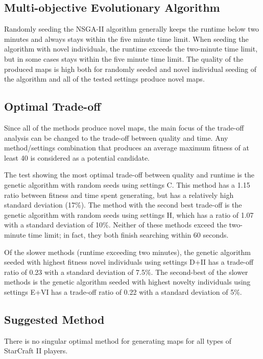 \subsection{Multi-objective Evolutionary Algorithm}
\label{discussion_comparison_moea}
Randomly seeding the NSGA-II algorithm generally keeps the runtime below two minutes and always stays within the five minute time limit. When seeding the algorithm with novel individuals, the runtime exceeds the two-minute time limit, but in some cases stays within the five minute time limit. The quality of the produced maps is high both for randomly seeded and novel individual seeding of the algorithm and all of the tested settings produce novel maps.

\subsection{Optimal Trade-off}
\label{discussion_comparison_tradeoff}
Since all of the methods produce novel maps, the main focus of the trade-off analysis can be changed to the trade-off between quality and time. Any method/settings combination that produces an average maximum fitness of at least 40 is considered as a potential candidate.

The test showing the most optimal trade-off between quality and runtime is the genetic algorithm with random seeds using settings C. This method has a 1.15 ratio between fitness and time spent generating, but has a relatively high standard deviation (17\%). The method with the second best trade-off is the genetic algorithm with random seeds using settings H, which has a ratio of 1.07 with a standard deviation of 10\%. Neither of these methods exceed the two-minute time limit; in fact, they both finish searching within 60 seconds.

Of the slower methods (runtime exceeding two minutes), the genetic algorithm seeded with highest fitness novel individuals using settings D+II has a trade-off ratio of 0.23 with a standard deviation of 7.5\%. The second-best of the slower methods is the genetic algorithm seeded with highest novelty individuals using settings E+VI has a trade-off ratio of 0.22 with a standard deviation of 5\%.

\subsection{Suggested Method}
\label{discussion_comparison_suggestedmethod}
There is no singular optimal method for generating maps for all types of StarCraft II players. 

